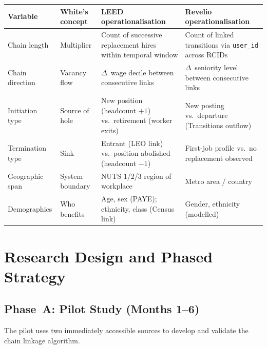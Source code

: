 \documentclass[a4paper]{tufte-handout}
\begin{document}
\begin{fullwidth}
	\smallskip
	\small
	\begin{tabularx}{\linewidth}{@{}l l X X@{}}
		\toprule
		\textbf{Variable} & \textbf{White's concept} & \textbf{LEED operationalisation}                             & \textbf{Revelio operationalisation}                            \\
		\midrule
		Chain length      & Multiplier               & Count of successive replacement hires within temporal window & Count of linked transitions via \texttt{user\_id} across RCIDs \\[3pt]
		Chain direction   & Vacancy flow             & $\Delta$~wage decile between consecutive links               & $\Delta$~seniority level between consecutive links             \\[3pt]
		Initiation type   & Source of hole           & New position (headcount $+1$) vs.\ retirement (worker exits) & New posting vs.\ departure (Transitions outflow)               \\[3pt]
		Termination type  & Sink                     & Entrant (LEO link) vs.\ position abolished (headcount $-1$)  & First-job profile vs.\ no replacement observed                 \\[3pt]
		Geographic span   & System boundary          & NUTS 1/2/3 region of workplace                               & Metro area / country                                           \\[3pt]
		Demographics      & Who benefits             & Age, sex (PAYE); ethnicity, class (Census link)              & Gender, ethnicity (modelled)                                   \\
		\bottomrule
	\end{tabularx}
	\smallskip
\end{fullwidth}


\section{Research Design and Phased Strategy}

\subsection{Phase~A: Pilot Study (Months 1--6)}

The pilot uses two immediately accessible sources to develop and validate the chain linkage algorithm.
\end{document}

